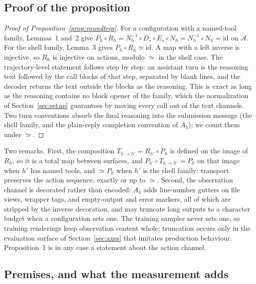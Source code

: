 \documentclass{article} %
\begin{document}
\subsection{Proof of the proposition}
\label{app:theorem}

\begin{proof}[Proof of Proposition~\ref{prop:roundtrip}]
For a configuration with a named-tool family, Lemmas~1 and~2 give
$P_h\circ R_h = N_h^{-1}\circ D_s\circ E_s\circ N_h = N_h^{-1}\circ N_h =
\mathrm{id}$ on $\mathcal{A}$. For the shell family, Lemma~3 gives
$P_h\circ R_h\simeq\mathrm{id}$. A map with a left inverse is injective, so
$R_h$ is injective on actions, modulo $\simeq$ in the shell case. The
trajectory-level statement follows step by step: an assistant turn is the
reasoning text followed by the call blocks of that step, separated by blank
lines, and the decoder returns the text outside the blocks as the reasoning.
This is exact as long as the reasoning contains no block opener of the family,
which the normalization of Section~\ref{sec:setup} guarantees by moving
every call out of the text channels. Two turn conventions absorb the final
reasoning into the submission message (the shell family, and the plain-reply
completion convention of $A_5$); we count them under $\simeq$.
\end{proof}

Two remarks. First, the composition $T_{h\to h'}=R_{h'}\circ P_h$ is defined
on the image of $R_h$, so it is a total map between surfaces, and
$P_{h'}\circ T_{h\to h'}=P_h$ on that image when $h'$ has named tools, and
$\simeq P_h$ when $h'$ is the shell family: transport preserves the action
sequence, exactly or up to $\simeq$. Second, the observation channel is decorated rather than
encoded: $A_4$ adds line-number gutters on file views, wrapper tags, and
empty-output and error markers, all of which are stripped by the inverse
decoration, and may truncate long outputs to a character budget when a configuration
sets one. The training sampler never sets one, so training renderings keep
observation content whole; truncation occurs only in the evaluation surface
of Section~\ref{sec:axes} that imitates production behaviour. Proposition~1
is in any case a statement about the action channel.

\subsection{Premises, and what the measurement adds}
\label{app:premises}
\end{document}
